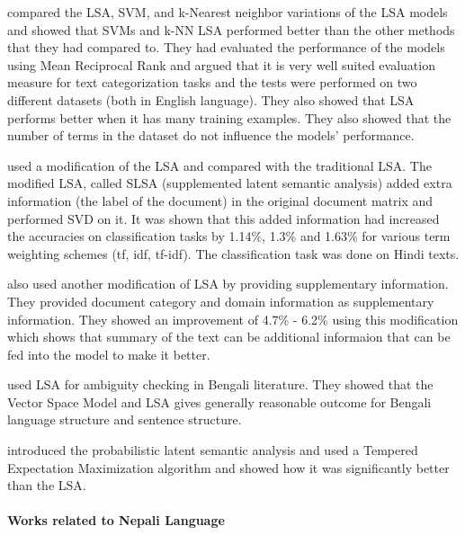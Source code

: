 \documentclass[12pt]{report}
\begin{document}
                            \cite{cardoso2003empirical} compared the LSA, SVM, and k-Nearest neighbor variations of the LSA models and showed that SVMs and k-NN LSA performed better
                            than the other methods that they had compared to. They had evaluated the performance of the models using Mean Reciprocal Rank and argued that it is very well
                            suited evaluation measure for text categorization tasks and the tests were performed on two different datasets (both in English language). They also showed that LSA performs better
                            when it has many training examples. They also showed that the number of terms in the dataset do not influence the models' performance.

                            \cite{krishnamurthi2017including} used a modification of the LSA and compared with the traditional LSA. The modified LSA, called
                            SLSA (supplemented latent semantic analysis) added extra information (the label of the document) in the original document matrix
                            and performed SVD on it. It was shown that this added information had increased the accuracies on classification tasks by 1.14\%, 1.3\%
                            and 1.63\% for various term weighting schemes (tf, idf, tf-idf). The classification task was done on Hindi texts.

                            \cite{krishnamurthi2016understanding} also used another modification of LSA by providing supplementary information. They provided
                            document category and domain information as supplementary information. They showed an improvement of 4.7\% - 6.2\% using this modification which shows that
                            summary of the text can be additional informaion that can be fed into the model to make it better.

                            \cite{nipu2017machine} used LSA for ambiguity checking in Bengali literature. They showed that the Vector Space Model and LSA gives generally reasonable
                            outcome for Bengali language structure and sentence structure.

                            \cite{hofmann2013probabilistic} introduced the probabilistic latent semantic analysis and used a Tempered Expectation Maximization algorithm and showed how it was
                            significantly better than the LSA.
                    \paragraph{Works related to Nepali Language}
\end{document}
